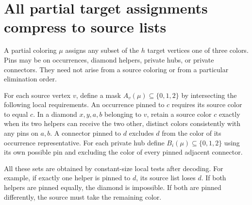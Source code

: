 \documentclass[11pt]{article}
\newcommand{\Col}{\{0,1,2\}}
\begin{document}
\section{All partial target assignments compress to source lists}
A partial coloring $\mu$ assigns any subset of the $h$ target vertices one
of three colors. Pins may be on occurrences, diamond helpers, private hubs,
or private connectors. They need not arise from a source coloring or from
a particular elimination order.

For each source vertex $v$, define a mask $A_v(\mu)\subseteq\Col$ by
intersecting the following local requirements. An occurrence pinned to $c$
requires its source color to equal $c$. In a diamond $x,y,a,b$ belonging to
$v$, retain a source color $c$ exactly when its two helpers can receive the
two other, distinct colors consistently with any pins on $a,b$. A connector
pinned to $d$ excludes $d$ from the color of its occurrence representative.
For each private hub define $B_i(\mu)\subseteq\Col$ using its own possible
pin and excluding the color of every pinned adjacent connector.

All these sets are obtained by constant-size local tests after decoding.
For example, if exactly one helper is pinned to $d$, its source list loses
$d$. If both helpers are pinned equally, the diamond is impossible. If both
are pinned differently, the source must take the remaining color.
\end{document}
